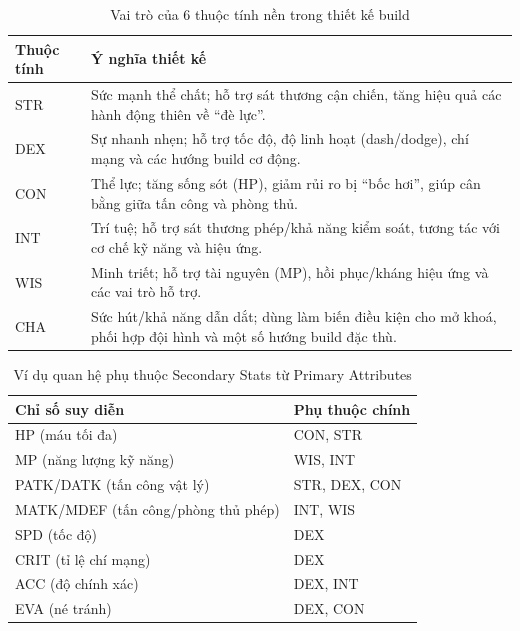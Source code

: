 \begin{table}[H]
\centering
\caption{Vai trò của 6 thuộc tính nền trong thiết kế build}
\label{tab:primary-attributes}
\begin{tabular}{|l|L{11cm}|}
\hline
\textbf{Thuộc tính} & \textbf{Ý nghĩa thiết kế} \\
\hline
STR & Sức mạnh thể chất; hỗ trợ sát thương cận chiến, tăng hiệu quả các hành động thiên về ``đè lực''. \\
\hline
DEX & Sự nhanh nhẹn; hỗ trợ tốc độ, độ linh hoạt (dash/\allowbreak dodge), chí mạng và các hướng build cơ động. \\
\hline
CON & Thể lực; tăng sống sót (HP), giảm rủi ro bị ``bốc hơi'', giúp cân bằng giữa tấn công và phòng thủ. \\
\hline
INT & Trí tuệ; hỗ trợ sát thương phép/\allowbreak khả năng kiểm soát, tương tác với cơ chế kỹ năng và hiệu ứng. \\
\hline
WIS & Minh triết; hỗ trợ tài nguyên (MP), hồi phục/\allowbreak kháng hiệu ứng và các vai trò hỗ trợ. \\
\hline
CHA & Sức hút/\allowbreak khả năng dẫn dắt; dùng làm biến điều kiện cho mở khoá, phối hợp đội hình và một số hướng build đặc thù. \\
\hline
\end{tabular}
\end{table}

\begin{table}[H]
\centering
\caption{Ví dụ quan hệ phụ thuộc Secondary Stats từ Primary Attributes}
\label{tab:derived-stats}
\begin{tabular}{|l|l|}
\hline
\textbf{Chỉ số suy diễn} & \textbf{Phụ thuộc chính} \\
\hline
HP (máu tối đa) & CON, STR \\
\hline
MP (năng lượng kỹ năng) & WIS, INT \\
\hline
PATK/\allowbreak DATK (tấn công vật lý) & STR, DEX, CON \\
\hline
MATK/\allowbreak MDEF (tấn công/\allowbreak phòng thủ phép) & INT, WIS \\
\hline
SPD (tốc độ) & DEX \\
\hline
CRIT (tỉ lệ chí mạng) & DEX \\
\hline
ACC (độ chính xác) & DEX, INT \\
\hline
EVA (né tránh) & DEX, CON \\
\hline
\end{tabular}
\end{table}

